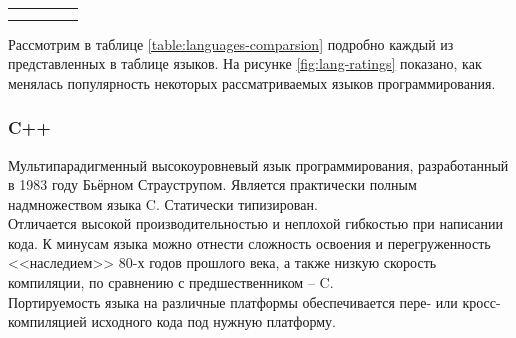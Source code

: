 \begin{table}
{\begin{longtable}{*{5}{| c}|}
                 & 
                 &
                 &
                 \\
            \hline
                 & 
                 & 
                 &
                 &
                 \\
            \hline
                 & 
                 & 
                 &
                 &
                 \\
            \hline
        \end{longtable}
    }
\end{table}

Рассмотрим в таблице \ref{table:languages-comparsion} подробно каждый из представленных в таблице языков.
На рисунке \ref{fig:lang-ratings} показано, как менялась популярность 
некоторых рассматриваемых языков программирования.

\subsubsection{C++}\label{sec:ch2/sec1/sub1/sub1}
Мультипарадигменный высокоуровневый язык программирования,
разработанный в 1983 году Бьёрном Страуструпом. Является практически
полным надмножеством языка C. Статически типизирован.\\
Отличается высокой производительностью и неплохой гибкостью при написании кода.
К минусам языка можно отнести сложность освоения и перегруженность 
<<наследием>> 80-х годов прошлого века, а также низкую скорость компиляции,
по сравнению с предшественником -- C.\\
Портируемость языка на различные платформы обеспечивается пере- или
кросс-компиляцией исходного кода под нужную платформу.


